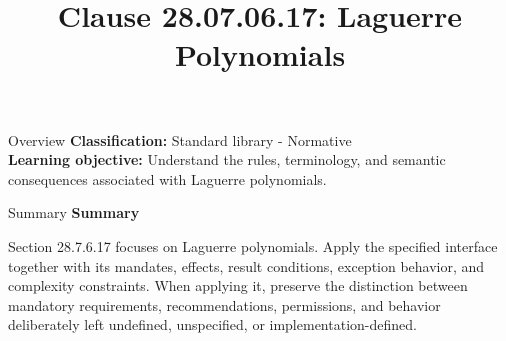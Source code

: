 \documentclass[10pt,letterpaper]{article}
\title{Clause 28.07.06.17: Laguerre Polynomials}
\author{}
\date{}
\begin{document}
\maketitle
\begin{CornellOverviewBox}{Overview}
\textbf{Classification:} Standard library - Normative\\[2pt]
\textbf{Learning objective:} Understand the rules, terminology, and semantic consequences associated with Laguerre polynomials.
\end{CornellOverviewBox}\begin{CornellSummaryBox}{Summary}
{\sffamily\bfseries\color{Accent} Summary}\par\vspace{3pt}Section 28.7.6.17 focuses on Laguerre polynomials. Apply the specified interface together with its mandates, effects, result conditions, exception behavior, and complexity constraints. When applying it, preserve the distinction between mandatory requirements, recommendations, permissions, and behavior deliberately left undefined, unspecified, or implementation-defined.
\end{CornellSummaryBox}
\end{document}
